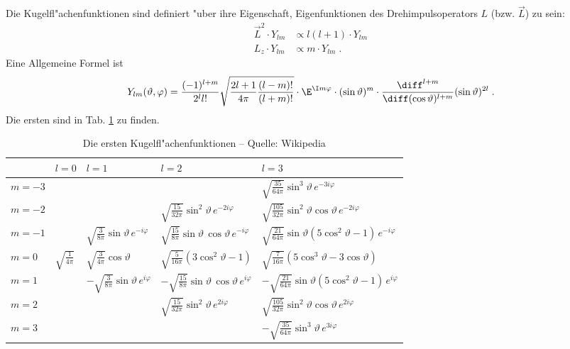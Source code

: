 \documentclass[a4paper,draft]{article}
\begin{document}
Die Kugelfl"achenfunktionen sind definiert "uber ihre Eigenschaft,
Eigenfunktionen des Drehimpulsoperators $L$ (bzw. $\vec L$) zu sein:
\begin{align*}
  {\vec L}^2 \cdot Y_{lm} & \propto l(l+1)  \cdot Y_{lm} \\
  L_z \cdot Y_{lm} &\propto m \cdot Y_{lm} \;.
\end{align*}
Eine Allgemeine Formel ist
\begin{equation*}
  Y_{lm}(\vartheta,\varphi) = 
\frac{(-1)^{l+m}}{2^l l!}
\sqrt{ \frac{2l + 1}{4\pi} \frac{(l-m)!}{(l+m)!} } \cdot \E^{ \I m
  \varphi} \cdot (\sin\vartheta)^m \cdot 
\frac{\diff ^{l+m}}{\diff (\cos\vartheta)^{l+m} }
(\sin\vartheta)^{2l} \;.
\end{equation*}
Die ersten sind in Tab. \ref{tab:kugelflaechenfunktionen} zu finden.

\begin{table}[h]
  \centering
  \begin{tabular}{l | l l l l}
\toprule
    ~ & $l=0$ & $l=1$ & $l=2$ & $l=3$ \\
\midrule
$m=-3$ & & & & $\sqrt{\tfrac{35}{64 \pi}} \sin^{3}{\vartheta}\,e^{-3i
  \varphi}$\\
$m=-2$ & & & $\sqrt{\tfrac{15}{32 \pi}} \sin^{2}{\vartheta} \, e^{-2i
  \varphi}$ & $\sqrt{\tfrac{105}{32\pi}}
\sin^{2}{\vartheta}\cos{\vartheta}\,e^{-2i \varphi}$\\
$m=-1$ & & $\sqrt{\tfrac{3}{8 \pi}}   \sin{\vartheta} \, e^{-i
  \varphi}$ & $\sqrt{\tfrac{15}{8 \pi}}  \sin{\vartheta} \,
\cos{\vartheta} \, e^{-i \varphi}$ & $\sqrt{\tfrac{21}{64 \pi}}
\sin{\vartheta}\left( 5 \cos^{2}{\vartheta} - 1\right)\,e^{-i
  \varphi}$ \\
$m=0$ & $\sqrt{\tfrac{1}{4 \pi}}$ & $\sqrt{\tfrac{3}{4 \pi}}
\cos{\vartheta}$ & $\sqrt{\tfrac{5}{16 \pi}}  \left( 3
  \cos^{2}{\vartheta} - 1 \right)$ & $\sqrt{\tfrac{7}{16 \pi}}  \left(
  5 \cos^{3}{\vartheta} - 3 \cos{\vartheta}\right)$ \\
$m=1$ & & $-\sqrt{\tfrac{3}{8 \pi}}  \sin{\vartheta} \, e^{i \varphi}$
& $-\sqrt{\tfrac{15}{8 \pi}} \sin{\vartheta} \, \cos{\vartheta} \,
e^{i \varphi}$ & $-\sqrt{\tfrac{21}{64\pi}} \sin{\vartheta}\left( 5
  \cos^{2}{\vartheta} - 1\right)\,e^{i \varphi}$ \\
$m=2$ & & & $\sqrt{\tfrac{15}{32 \pi}}  \sin^{2}{\vartheta} \, e^{2i
  \varphi}$ & $\sqrt{\tfrac{105}{32 \pi}}
\sin^{2}{\vartheta}\cos{\vartheta}\,e^{2i \varphi}$\\
$m=3$ & & & & $-\sqrt{\tfrac{35}{64 \pi}} \sin^{3}{\vartheta}\,e^{3i \varphi}$\\
\bottomrule
  \end{tabular}
  \caption{Die ersten Kugelfl"achenfunktionen -- Quelle: Wikipedia}
  \label{tab:kugelflaechenfunktionen}
\end{table}
\end{document}
